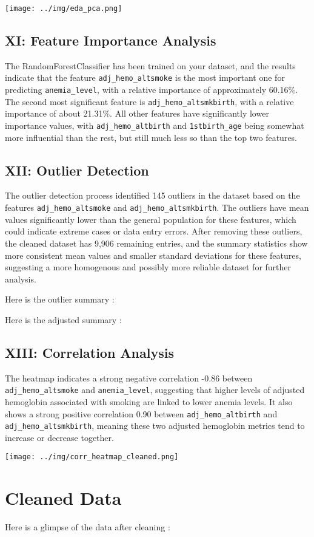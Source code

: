 \texttt{[image: ../img/eda\_pca.png]}



\subsection{XI: Feature Importance Analysis}

The RandomForestClassifier has been trained on your dataset, and the results indicate that the feature \texttt{adj\_hemo\_altsmoke} is the most important one for predicting \texttt{anemia\_level}, with a relative importance of approximately 60.16\%. The second most significant feature is \texttt{adj\_hemo\_altsmkbirth}, with a relative importance of about 21.31\%. All other features have significantly lower importance values, with \texttt{adj\_hemo\_altbirth} and \texttt{1stbirth\_age} being somewhat more influential than the rest, but still much less so than the top two features.



\subsection{XII: Outlier Detection}


The outlier detection process identified 145 outliers in the dataset based on the features \texttt{adj\_hemo\_altsmoke} and \texttt{adj\_hemo\_altsmkbirth}. The outliers have mean values significantly lower than the general population for these features, which could indicate extreme cases or data entry errors. After removing these outliers, the cleaned dataset has 9,906 remaining entries, and the summary statistics show more consistent mean values and smaller standard deviations for these features, suggesting a more homogenous and possibly more reliable dataset for further analysis.

Here is the outlier summary :


Here is the adjusted summary :




\subsection{XIII: Correlation Analysis}

The heatmap indicates a strong negative correlation -0.86 between \texttt{adj\_hemo\_altsmoke} and \texttt{anemia\_level}, suggesting that higher levels of adjusted hemoglobin associated with smoking are linked to lower anemia levels. It also shows a strong positive correlation 0.90 between \texttt{adj\_hemo\_altbirth} and \texttt{adj\_hemo\_altsmkbirth}, meaning these two adjusted hemoglobin metrics tend to increase or decrease together.

\texttt{[image: ../img/corr\_heatmap\_cleaned.png]}


\newpage

\section{Cleaned Data}

Here is a glimpse of the data after cleaning :







\clearpage